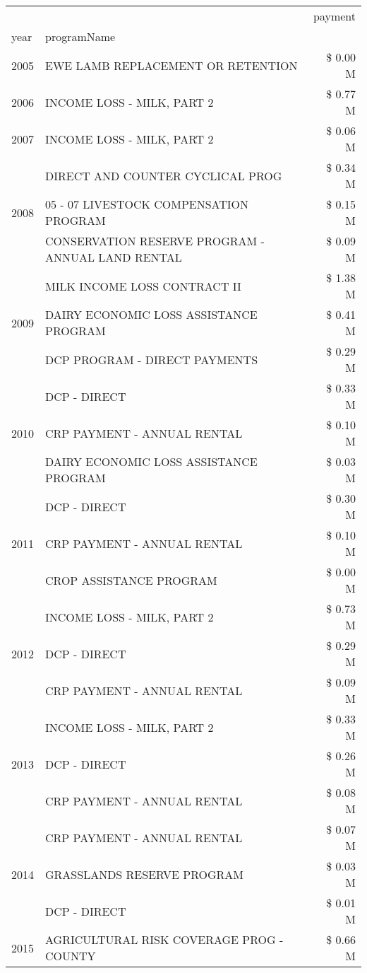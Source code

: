 \begin{tabular}{llr}
\toprule
 &  & payment \\
year & programName &  \\
\midrule
2005 & EWE LAMB REPLACEMENT OR RETENTION & \$ 0.00 M \\
\cline{1-3}
2006 & INCOME LOSS - MILK, PART 2 & \$ 0.77 M \\
\cline{1-3}
2007 & INCOME LOSS - MILK, PART 2 & \$ 0.06 M \\
\cline{1-3}
\multirow[t]{3}{*}{2008} & DIRECT AND COUNTER CYCLICAL PROG & \$ 0.34 M \\
 & 05 - 07 LIVESTOCK COMPENSATION PROGRAM & \$ 0.15 M \\
 & CONSERVATION RESERVE PROGRAM - ANNUAL LAND RENTAL & \$ 0.09 M \\
\cline{1-3}
\multirow[t]{3}{*}{2009} & MILK INCOME LOSS CONTRACT II & \$ 1.38 M \\
 & DAIRY ECONOMIC LOSS ASSISTANCE PROGRAM & \$ 0.41 M \\
 & DCP PROGRAM - DIRECT PAYMENTS & \$ 0.29 M \\
\cline{1-3}
\multirow[t]{3}{*}{2010} & DCP - DIRECT & \$ 0.33 M \\
 & CRP PAYMENT - ANNUAL RENTAL & \$ 0.10 M \\
 & DAIRY ECONOMIC LOSS ASSISTANCE PROGRAM & \$ 0.03 M \\
\cline{1-3}
\multirow[t]{3}{*}{2011} & DCP - DIRECT & \$ 0.30 M \\
 & CRP PAYMENT - ANNUAL RENTAL & \$ 0.10 M \\
 & CROP ASSISTANCE PROGRAM & \$ 0.00 M \\
\cline{1-3}
\multirow[t]{3}{*}{2012} & INCOME LOSS - MILK, PART 2 & \$ 0.73 M \\
 & DCP - DIRECT & \$ 0.29 M \\
 & CRP PAYMENT - ANNUAL RENTAL & \$ 0.09 M \\
\cline{1-3}
\multirow[t]{3}{*}{2013} & INCOME LOSS - MILK, PART 2 & \$ 0.33 M \\
 & DCP - DIRECT & \$ 0.26 M \\
 & CRP PAYMENT - ANNUAL RENTAL & \$ 0.08 M \\
\cline{1-3}
\multirow[t]{3}{*}{2014} & CRP PAYMENT - ANNUAL RENTAL & \$ 0.07 M \\
 & GRASSLANDS RESERVE PROGRAM & \$ 0.03 M \\
 & DCP - DIRECT & \$ 0.01 M \\
\cline{1-3}
\multirow[t]{3}{*}{2015} & AGRICULTURAL RISK COVERAGE PROG - COUNTY & \$ 0.66 M \\

\end{tabular}

